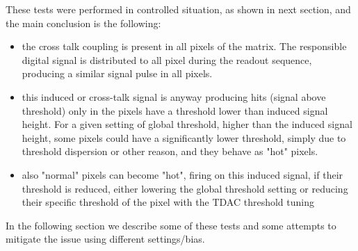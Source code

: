 These tests were performed in controlled situation, as shown in next section,  and the main conclusion is the following:
\begin{itemize}
\item the cross talk coupling is present in all pixels of the matrix. The responsible digital signal is distributed to all pixel during the readout sequence,  producing a similar signal pulse in all pixels.
\item this induced or cross-talk signal is anyway producing hits (signal above threshold) only in the pixels have a threshold lower than induced signal height. For a given setting of global threshold, higher than the induced signal height, some pixels could have a significantly lower threshold,  simply due to threshold dispersion or other reason, and they behave as "hot" pixels.  
\item also "normal" pixels can become "hot", firing on this induced signal, if their threshold is reduced, either lowering the global threshold setting or reducing their specific threshold of the pixel with the TDAC threshold tuning
\end{itemize}



In the following section we describe some of these tests and some attempts to mitigate the issue using different settings/bias.






